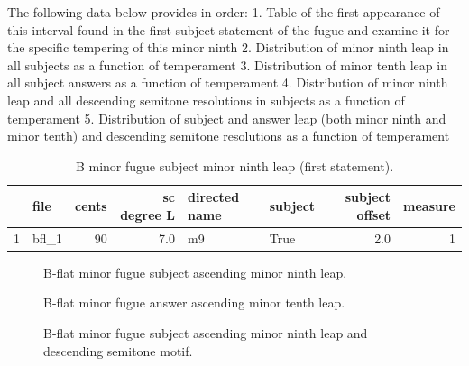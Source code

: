The following data below provides in order: 1. Table of the first
appearance of this interval found in the first subject statement of the
fugue and examine it for the specific tempering of this minor ninth 2.
Distribution of minor ninth leap in all subjects as a function of
temperament 3. Distribution of minor tenth leap in all subject answers
as a function of temperament 4. Distribution of minor ninth leap and all
descending semitone resolutions in subjects as a function of temperament
5. Distribution of subject and answer leap (both minor ninth and minor
tenth) and descending semitone resolutions as a function of temperament

\begin{singlespace}
\begin{table}[H]
\centering
\tiny
\begin{tabular}{|llrrllrr|}
\hline
\textbf{{}} & \textbf{  file} & \textbf{ cents} & \textbf{ sc degree L} & \textbf{directed name} & \textbf{subject} & \textbf{ subject offset} & \textbf{ measure }\\
\hline
1 &  bfl\_1 &     90 &          7.0 &            m9 &    True &             2.0 &        1 \\
\hline
\end{tabular}
\caption{B minor fugue subject minor ninth leap (first statement). }
\end{table}
\normalsize
\end{singlespace}




\begin{figure}[H]
\vspace{1.5em}
    \centering
    \caption{B-flat minor fugue subject ascending minor ninth leap. }
\end{figure}


\begin{figure}[H]
\vspace{1.5em}
    \centering
    \caption{B-flat minor fugue answer ascending minor tenth leap. }
\end{figure}


\begin{figure}[H]
\vspace{1.5em}
    \centering
    \caption{B-flat minor fugue subject ascending minor ninth leap and descending semitone motif. }
\end{figure}


